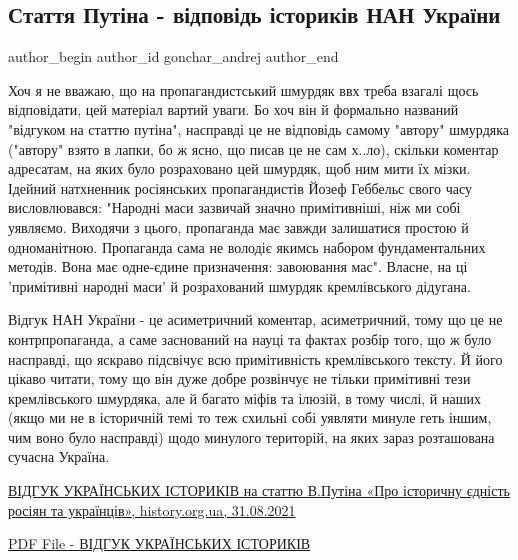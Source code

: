  
 
 
 
 
 
\subsection{Стаття Путіна - відповідь істориків НАН України}
\label{sec:18_07_2021.fb.gonchar_andrej.1.otvet_nanu_putin}
 
\ifcmt
 author_begin
   author_id gonchar_andrej
 author_end
\fi

Хоч я не вважаю, що на пропагандистський шмурдяк ввх треба взагалі щось
відповідати, цей матеріал вартий уваги. Бо хоч він й формально названий
"відгуком на статтю путіна", насправді це не відповідь самому "автору"
шмурдяка ("автору" взято в лапки, бо ж ясно, що писав це не сам х..ло), скільки
коментар адресатам, на яких було розраховано цей шмурдяк, щоб ним мити їх
мізки. Ідейний натхненник росіянських пропагандистів Йозеф Геббельс свого часу
висловлювався: "Народні маси зазвичай значно примітивніші, ніж ми собі
уявляємо. Виходячи з цього, пропаганда має завжди залишатися простою й
одноманітною.  Пропаганда сама не володіє якимсь набором фундаментальних
методів. Вона має одне-єдине призначення: завоювання мас". Власне, на ці
'примітивні народні маси' й розрахований шмурдяк  кремлівського дідугана.

Відгук НАН України - це асиметричний коментар, асиметричний, тому що це не
контрпропаганда, а саме заснований на науці та фактах розбір того, що ж було
насправді, що яскраво підсвічує всю примітивність кремлівського тексту. Й його
цікаво читати, тому що він дуже добре розвінчує не тільки примітивні тези
кремлівського шмурдяка, але й багато міфів та ілюзій, в тому числі, й наших
(якщо ми не в історичній темі то теж схильні собі уявляти минуле геть іншим,
чим воно було насправді) щодо минулого територій, на яких зараз розташована
сучасна Україна.

\href{http://history.org.ua/uk/post/46121}{%
ВІДГУК УКРАЇНСЬКИХ ІСТОРИКІВ на статтю В.Путіна «Про історичну єдність росіян та українців», history.org.ua, 31.08.2021%
}

\href{http://history.org.ua/uploads/editor-files/2021_07/60f173e4b208a.pdf}{%
PDF File - ВІДГУК УКРАЇНСЬКИХ ІСТОРИКІВ%
}
